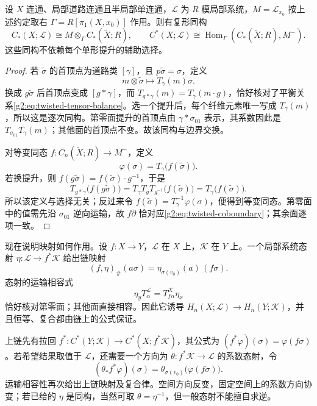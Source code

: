 \begin{theorem}\label{g2:thm:twisted-cover-model}
	设 \(X\) 连通、局部道路连通且半局部单连通，\(\mathcal L\) 为 \(R\) 模局部系统，\(M=\mathcal L_{x_0}\) 按上述约定取右 \(\Gamma=R[\pi_1(X,x_0)]\) 作用。则有复形同构
	\[
		C_*(X;\mathcal L)\cong M\otimes_\Gamma C_*(\widetilde X;R),\qquad
		C^*(X;\mathcal L)\cong\operatorname{Hom}_\Gamma(C_*(\widetilde X;R),M^-).
	\]
	这些同构不依赖每个单形提升的辅助选择。
\end{theorem}
\begin{proof}
	若 \(\widetilde\sigma\) 的首顶点为道路类 \([\gamma]\)，且 \(p\widetilde\sigma=\sigma\)，定义
	\[
		m\otimes\widetilde\sigma\longmapsto T_\gamma(m)\sigma.
	\]
	换成 \(g\widetilde\sigma\) 后首顶点变成 \([g*\gamma]\)，而 \(T_{g*\gamma}(m)=T_\gamma(m\cdot g)\)，恰好核对了平衡关系\eqref{g2:eq:twisted-tensor-balance}。选一个提升后，每个纤维元素唯一写成 \(T_\gamma(m)\)，所以这是逐次同构。第零面提升的首顶点由 \(\gamma*\sigma_{01}\) 表示，其系数因此是 \(T_{\sigma_{01}}T_\gamma(m)\)；其他面的首顶点不变。故该同构与边界交换。

	对等变同态 \(f:C_n(\widetilde X;R)\to M^-\)，定义
	\[
		\varphi(\sigma)=T_\gamma\bigl(f(\widetilde\sigma)\bigr).
	\]
	若换提升，则 \(f(g\widetilde\sigma)=f(\widetilde\sigma)\cdot g^{-1}\)，于是
	\[
		T_{g*\gamma}\bigl(f(g\widetilde\sigma)\bigr)
		=T_\gamma T_gT_{g^{-1}}\bigl(f(\widetilde\sigma)\bigr)
		=T_\gamma\bigl(f(\widetilde\sigma)\bigr).
	\]
	所以该定义与选择无关；反过来令 \(f(\widetilde\sigma)=T_\gamma^{-1}\varphi(\sigma)\)，便得到等变同态。第零面中的值需先沿 \(\sigma_{01}\) 逆向运输，故 \(f\partial\) 恰对应\eqref{g2:eq:twisted-coboundary}；其余面逐项一致。
\end{proof}

现在说明映射如何作用。设 \(f:X\to Y\)，\(\mathcal L\) 在 \(X\) 上，\(\mathcal K\) 在 \(Y\) 上。一个局部系统态射 \(\eta:\mathcal L\to f^*\mathcal K\) 给出链映射
\[
	(f,\eta)_\#(a\sigma)=\eta_{\sigma(v_0)}(a)\,(f\sigma).
\]
态射的运输相容式
\[
	\eta_yT^{\mathcal L}_\alpha=T^{\mathcal K}_{f\alpha}\eta_x
\]
恰好核对第零面；其他面直接相容。因此它诱导 \(H_n(X;\mathcal L)\to H_n(Y;\mathcal K)\)，并且恒等、复合都由链上的公式保证。

\ProseParagraphBreak

上链先有拉回 \(f^*:C^*(Y;\mathcal K)\to C^*(X;f^*\mathcal K)\)，其公式为 \((f^*\varphi)(\sigma)=\varphi(f\sigma)\)。若希望结果取值于 \(\mathcal L\)，还需要一个方向为 \(\theta:f^*\mathcal K\to\mathcal L\) 的系数态射，令
\[
	(\theta_*f^*\varphi)(\sigma)=\theta_{\sigma(v_0)}\bigl(\varphi(f\sigma)\bigr).
\]
运输相容性再次给出上链映射及复合律。空间方向反变，固定空间上的系数方向协变；若已给的 \(\eta\) 是同构，当然可取 \(\theta=\eta^{-1}\)，但一般态射不能擅自求逆。

